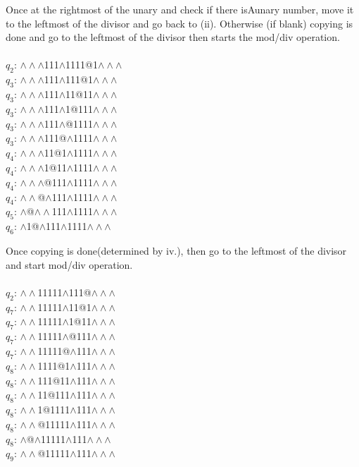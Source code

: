 \documentclass[a4paper]{article} %
\begin{document}
\begin{tasks}[label={(\roman*)},label-width={0.7cm},before-skip = -\parskip , %
            after-skip = -\parskip,
            after-item-skip = -\parskip]
            \task
            Once at the rightmost of the unary and check if there isAunary number, move it to the leftmost of the divisor and go back to (ii). Otherwise (if blank) copying is done and go to the leftmost of the divisor then starts the mod/div operation. \\\\
            $q_2$: $\land\land\land$111$\land$1111@1$\land\land\land$\\
            $q_3$: $\land\land\land$111$\land$111@1$\land\land\land$\\
            $q_3$: $\land\land\land$111$\land$11@11$\land\land\land$\\
            $q_3$: $\land\land\land$111$\land$1@111$\land\land\land$\\
            $q_3$: $\land\land\land$111$\land$@1111$\land\land\land$\\
            $q_3$: $\land\land\land$111@$\land$1111$\land\land\land$\\
            $q_4$: $\land\land\land$11@1$\land$1111$\land\land\land$\\
            $q_4$: $\land\land\land$1@11$\land$1111$\land\land\land$\\
            $q_4$: $\land\land\land$@111$\land$1111$\land\land\land$\\
            $q_4$: $\land\land$@$\land$111$\land$1111$\land\land\land$\\
            $q_5$: $\land$@$\land\land$111$\land$1111$\land\land\land$\\
            $q_6$: $\land$1@$\land$111$\land$1111$\land\land\land$

            \task Once copying is done(determined by iv.), then go to the leftmost of the divisor and start mod/div operation.\\\\
            $q_2$: $\land\land$11111$\land$111@$\land\land\land$\\
            $q_7$: $\land\land$11111$\land$11@1$\land\land\land$\\
            $q_7$: $\land\land$11111$\land$1@11$\land\land\land$\\
            $q_7$: $\land\land$11111$\land$@111$\land\land\land$\\
            $q_7$: $\land\land$11111@$\land$111$\land\land\land$\\
            $q_8$: $\land\land$1111@1$\land$111$\land\land\land$\\
            $q_8$: $\land\land$111@11$\land$111$\land\land\land$\\
            $q_8$: $\land\land$11@111$\land$111$\land\land\land$\\
            $q_8$: $\land\land$1@1111$\land$111$\land\land\land$\\
            $q_8$: $\land\land$@11111$\land$111$\land\land\land$\\
            $q_8$: $\land$@$\land$11111$\land$111$\land\land\land$\\
            $q_9$: $\land\land$@11111$\land$111$\land\land\land$


\end{tasks}
\end{document}
